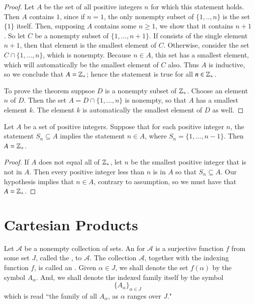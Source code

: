 \documentclass[12pt, a4paper, oneside, openright, titlepage]{book}
\begin{document}
\begin{appendices}
\begin{proof}
        Let $A$ be the set of all positive integers $n$ for which this statement holds. Then $A$ contains $1$, since if $n = 1$, the only nonempty subset of $\{1,..,n\}$ is the set $\{1\}$ itself. Then, supposing $A$ contains some $n \geq 1$, we show that it contains $n+1$. So let $C$ be a nonempty subset of $\{1,...,n+1\}$. If consists of the single element $n+1$, then that element is the smallest element of $C$. Otherwise, consider the set $C\cap\{1,...,n\}$, which is nonempty. Because $n \in A$, this set has a smallest element, which will automatically be the smallest element of $C$ also. Thus $A$ is inductive, so we conclude that $A = \mathbb Z_+$; hence the statement is true for all $n \in \mathbb Z_+$.

        To prove the theorem suppsoe $D$ is a nonempty subset of $\mathbb Z_+$. Choose an element $n$ of $D$. Then the set $A = D\cap\{1,...,n\}$ is nonempty, so that $A$ has a smallest element $k$. The element $k$ is automatically the smallest element of $D$ as well.
    \end{proof}

    \begin{namthm}
        Let $A$ be a set of positive integers. Suppose that for each positive integer $n$, the statement $S_n \subseteq A$ implies the statement $n \in A$, where $S_n = \{1,...,n-1\}$. Then $A = \mathbb Z_+$.
    \end{namthm}
    \begin{proof}
        If $A$ does not equal all of $\mathbb Z_+$, let $n$ be the smallest positive integer that is not in $A$. Then every positive integer less than $n$ is in $A$ so that $S_n \subseteq A$. Our hypothesis implies that $n \in A$, contrary to assumption, so we must have that $A = \mathbb Z_+$.
    \end{proof}


    \section{Cartesian Products}

    \begin{defn}
        Let $\mathscr{A}$ be a nonempty collection of sets. An  for $\mathscr{A}$ is a surjective function $f$ from some set $J$, called the , to $\mathscr{A}$. The collection $\mathscr{A}$, together with the indexing function $f$, is called an . Given $\alpha \in J$, we shall denote the set $f(\alpha)$ by the symbol $A_{\alpha}$. And, we shall denote the indexed family itself by the symbol \begin{equation*}
            \{A_{\alpha}\}_{\alpha \in J}
        \end{equation*}
        which is read ``the family of all $A_{\alpha}$, as $\alpha$ ranges over $J$."
    \end{defn}


\end{appendices}
\end{document}
